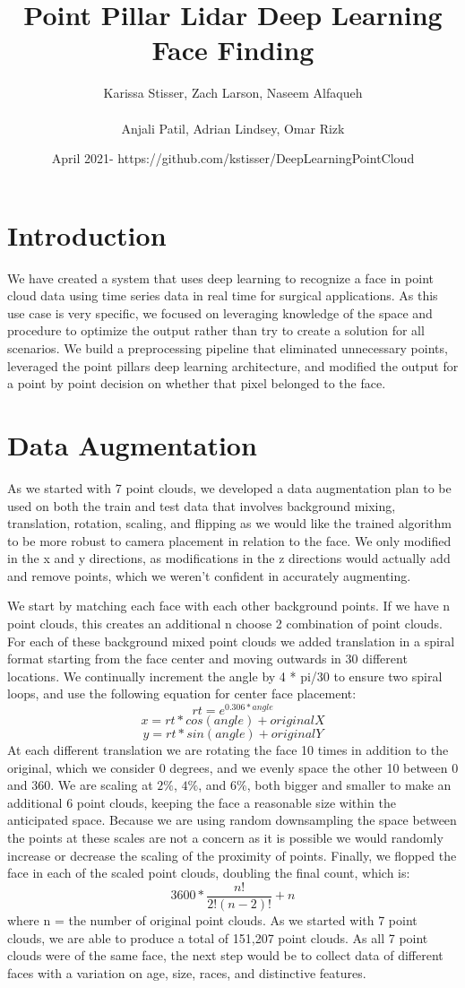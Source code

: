 \documentclass{article}
\title{Point Pillar Lidar Deep Learning Face Finding}
\author{Karissa Stisser, Zach Larson, Naseem Alfaqueh\\
\\Anjali Patil, Adrian Lindsey, Omar Rizk }
\date{April 2021- https://github.com/kstisser/DeepLearningPointCloud}
\begin{document}
\maketitle

\section{Introduction}
We have created a system that uses deep learning to recognize a face in point cloud data using time series data in real time for surgical applications. As this use case is very specific, we focused on leveraging knowledge of the space and procedure to optimize the output rather than try to create a solution for all scenarios. We build a preprocessing pipeline that eliminated unnecessary points, leveraged the point pillars deep learning architecture\cite{pointpillars}, and modified the output for a point by point decision on whether that pixel belonged to the face. 
\section{Data Augmentation}
As we started with 7 point clouds, we developed a data augmentation plan to be used on both the train and test data that involves background mixing, translation, rotation, scaling, and flipping as we would like the trained algorithm to be more robust to camera placement in relation to the face. We only modified in the x and y directions, as modifications in the z directions would actually add and remove points, which we weren't confident in accurately augmenting. 

We start by matching each face with each other background points. If we have n point clouds, this creates an additional n choose 2 combination of point clouds. 
For each of these background mixed point clouds we added translation in a spiral format starting from the face center and moving outwards in 30 different locations. We continually increment the angle by 4 * pi/30 to ensure two spiral loops, and use the following equation for center face placement:
\[rt = e^{0.306*angle}\]
\[x = rt * cos(angle) + originalX\]
\[y = rt * sin(angle) + originalY\]
At each different translation we are rotating the face 10 times in addition to the original, which we consider 0 degrees, and we evenly space the other 10 between 0 and 360. We are scaling at ${2\%}$, ${4\%}$, and ${6\%}$, both bigger and smaller to make an additional 6 point clouds, keeping the face a reasonable size within the anticipated space. Because we are using random downsampling the space between the points at these scales are not a concern as it is possible we would randomly increase or decrease the scaling of the proximity of points. 
Finally, we flopped the face in each of the scaled point clouds, doubling the final count, which is:
\[
    3600 * \frac{n!}{2!(n-2)!} + n
\]
where n = the number of original point clouds. As we started with 7 point clouds, we are able to produce a total of 151,207 point clouds. As all 7 point clouds were of the same face, the next step would be to collect data of different faces with a variation on age, size, races, and distinctive features. 
\end{document}
